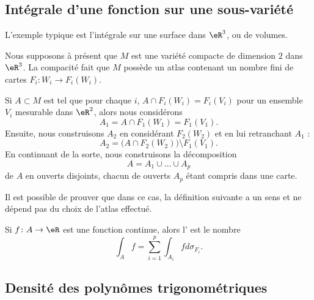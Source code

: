 \subsection{Intégrale d'une fonction sur une sous-variété}

L'exemple typique est l'intégrale sur une surface dans \( \eR^3\), ou de volumes.

Nous supposons à présent que \( M\) est une variété compacte de dimension \( 2\) dans \( \eR^3\). La compacité fait que \( M\) possède un atlas contenant un nombre fini de cartes \( F_i\colon W_i\to F_i(W_i)\).

Si \( A\subset M\) est tel que pour chaque \( i\), \( A\cap F_i(W_i)=F_i(V_i)\) pour un ensemble \( V_i\) mesurable dans \( \eR^2\), alors nous considérons
\begin{equation}
	A_1=A\cap F_1(W_1)=F_1(V_1).
\end{equation}
Ensuite, nous construisons \( A_2\) en considérant \( F_2(W_2)\) et en lui retranchant \( A_1\) :
\begin{equation}
	A_2=\big( A\cap F_2(W_2) \big)\setminus F_1(V_1).
\end{equation}
En continuant de la sorte, nous construisons la décomposition
\begin{equation}
	A=A_1\cup\ldots\cup A_p
\end{equation}
de \( A\) en ouverts disjoints, chacun de ouverts \( A_p\) étant compris dans une carte.

Il est possible de prouver que dans ce cas, la définition suivante a un sens et ne dépend pas du choix de l'atlas effectué.
\begin{definition}
	Si \( f\colon A\to \eR\) est une fonction continue, alors l' est le nombre
	\begin{equation}
		\int_Af=\sum_{i=1}^p\int_{A_i}fd\sigma_{F_i}.
	\end{equation}
\end{definition}

\subsection{Densité des polynômes trigonométriques}

